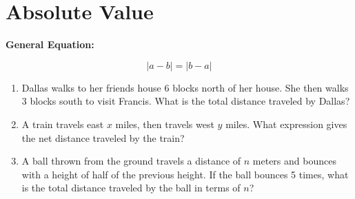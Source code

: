 \section{Absolute Value}

\bigskip
\textbf{General Equation:}

\[|a-b|=|b-a|\]

\vfill
\begin{enumerate}[labelindent=*,style=multiline,leftmargin=*,label=\textbf{Example \arabic*:}]
\item Dallas walks to her friends house 6 blocks north of her house. She then walks 3 blocks south to visit Francis. What is the total distance traveled by Dallas?

\vfill\item A train travels east $x$ miles, then travels west $y$ miles. What expression gives the net distance traveled by the train?

\vfill\item A ball thrown from the ground travels a distance of $n$ meters and bounces with a height of half of the previous height. If the ball bounces 5 times, what is the total distance traveled by the ball in terms of $n$?
\end{enumerate}

